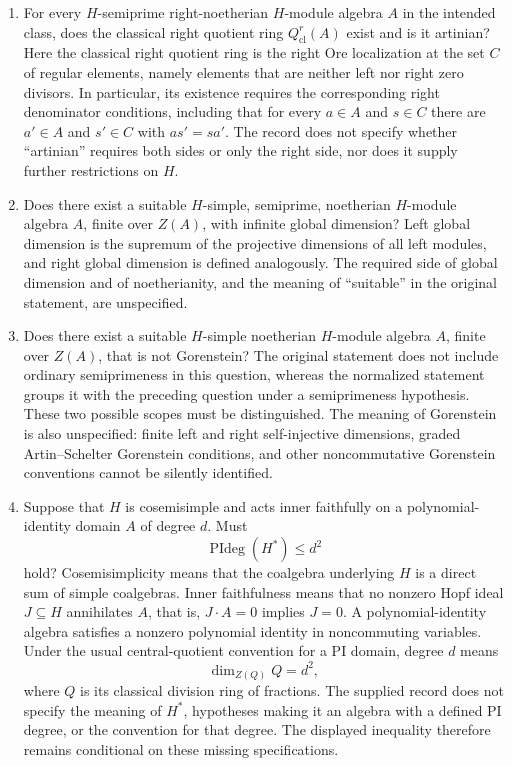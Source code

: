 \documentclass[11pt]{article}
\begin{document}
\begin{enumerate}
\item For every \(H\)-semiprime right-noetherian \(H\)-module algebra \(A\) in the intended class, does the classical right quotient ring \(Q_{\mathrm{cl}}^r(A)\) exist and is it artinian? Here the classical right quotient ring is the right Ore localization at the set \(C\) of regular elements, namely elements that are neither left nor right zero divisors. In particular, its existence requires the corresponding right denominator conditions, including that for every \(a\in A\) and \(s\in C\) there are \(a'\in A\) and \(s'\in C\) with \(as'=sa'\). The record does not specify whether ``artinian'' requires both sides or only the right side, nor does it supply further restrictions on \(H\).

\item Does there exist a suitable \(H\)-simple, semiprime, noetherian \(H\)-module algebra \(A\), finite over \(Z(A)\), with infinite global dimension? Left global dimension is the supremum of the projective dimensions of all left modules, and right global dimension is defined analogously. The required side of global dimension and of noetherianity, and the meaning of ``suitable'' in the original statement, are unspecified.

\item Does there exist a suitable \(H\)-simple noetherian \(H\)-module algebra \(A\), finite over \(Z(A)\), that is not Gorenstein? The original statement does not include ordinary semiprimeness in this question, whereas the normalized statement groups it with the preceding question under a semiprimeness hypothesis. These two possible scopes must be distinguished. The meaning of Gorenstein is also unspecified: finite left and right self-injective dimensions, graded Artin--Schelter Gorenstein conditions, and other noncommutative Gorenstein conventions cannot be silently identified.

\item Suppose that \(H\) is cosemisimple and acts inner faithfully on a polynomial-identity domain \(A\) of degree \(d\). Must
\[
 \operatorname{PIdeg}(H^*)\le d^2
\]
hold? Cosemisimplicity means that the coalgebra underlying \(H\) is a direct sum of simple coalgebras. Inner faithfulness means that no nonzero Hopf ideal \(J\subseteq H\) annihilates \(A\), that is, \(J\cdot A=0\) implies \(J=0\). A polynomial-identity algebra satisfies a nonzero polynomial identity in noncommuting variables. Under the usual central-quotient convention for a PI domain, degree \(d\) means
\[
 \dim_{Z(Q)}Q=d^2,
\]
where \(Q\) is its classical division ring of fractions. The supplied record does not specify the meaning of \(H^*\), hypotheses making it an algebra with a defined PI degree, or the convention for that degree. The displayed inequality therefore remains conditional on these missing specifications.


\end{enumerate}
\end{document}
